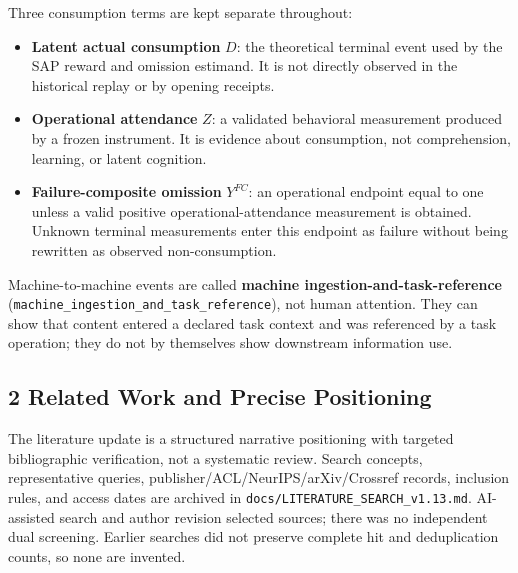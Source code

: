 \documentclass[
  11pt]{article}
\providecommand{\tightlist}{%
  \setlength{\itemsep}{0pt}\setlength{\parskip}{0pt}}
\begin{document}
Three consumption terms are kept separate throughout:

\begin{itemize}
\tightlist
\item
  \textbf{Latent actual consumption} \(D\): the theoretical terminal
  event used by the SAP reward and omission estimand. It is not directly
  observed in the historical replay or by opening receipts.
\item
  \textbf{Operational attendance} \(Z\): a validated behavioral
  measurement produced by a frozen instrument. It is evidence about
  consumption, not comprehension, learning, or latent cognition.
\item
  \textbf{Failure-composite omission} \(Y^{FC}\): an operational
  endpoint equal to one unless a valid positive operational-attendance
  measurement is obtained. Unknown terminal measurements enter this
  endpoint as failure without being rewritten as observed
  non-consumption.
\end{itemize}

Machine-to-machine events are called \textbf{machine
ingestion-and-task-reference}
(\texttt{machine\_ingestion\_and\_task\_reference}), not human
attention. They can show that content entered a declared task context
and was referenced by a task operation; they do not by themselves show
downstream information use.

\subsection{2 Related Work and Precise
Positioning}\label{related-work-and-precise-positioning}

The literature update is a structured narrative positioning with
targeted bibliographic verification, not a systematic review. Search
concepts, representative queries, publisher/ACL/NeurIPS/arXiv/Crossref
records, inclusion rules, and access dates are archived in
\texttt{docs/LITERATURE\_SEARCH\_v1.13.md}. AI-assisted search and
author revision selected sources; there was no independent dual
screening. Earlier searches did not preserve complete hit and
deduplication counts, so none are invented.
\end{document}
